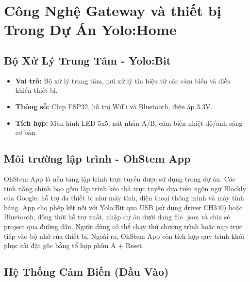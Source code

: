 \section{Công Nghệ Gateway và thiết bị Trong Dự Án Yolo:Home}

\subsection{ Bộ Xử Lý Trung Tâm - Yolo:Bit}

\begin{itemize}
    \item \textbf{Vai trò:} Bộ xử lý trung tâm, nơi xử lý tín hiệu từ các cảm biến và điều khiển thiết bị.
    \item \textbf{Thông số:} Chip ESP32, hỗ trợ WiFi và Bluetooth, điện áp 3.3V.
    \item \textbf{Tích hợp:} Màn hình LED 5x5, nút nhấn A/B, cảm biến nhiệt độ/ánh sáng cơ bản.
\end{itemize}

\subsection{ Môi trường lập trình - OhStem App}

OhStem App là nền tảng lập trình trực tuyến được sử dụng trong dự án. Các tính năng chính bao gồm lập trình kéo thả trực tuyến dựa trên ngôn ngữ Blockly của Google, hỗ trợ đa thiết bị như máy tính, điện thoại thông minh và máy tính bảng. App cho phép kết nối với Yolo:Bit qua USB (sử dụng driver CH340) hoặc Bluetooth, đồng thời hỗ trợ xuất, nhập dự án dưới dạng file .json và chia sẻ project qua đường dẫn. Người dùng có thể chạy thử chương trình hoặc nạp trực tiếp vào bộ nhớ của thiết bị. Ngoài ra, OhStem App còn tích hợp quy trình khôi phục cài đặt gốc bằng tổ hợp phím A + Reset.

\begin{center}
\end{center}

\subsection{ Hệ Thống Cảm Biến (Đầu Vào)}

